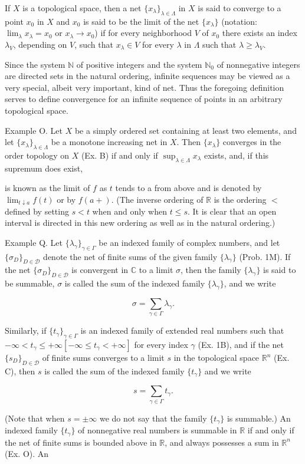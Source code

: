 If $X$ is a topological space, then a net $\{x_\lambda\}_{\lambda \in \Lambda}$ in $X$ is said to converge to a point $x_0$ in $X$ and $x_0$ is said to be the limit of the net $\{x_\lambda\}$ (notation: $\lim_\lambda x_\lambda = x_0$ or $x_\lambda \rightarrow x_0$) if for every neighborhood $V$ of $x_0$ there exists an index $\lambda_V$, depending on $V$, such that $x_\lambda \in V$ for every $\lambda$ in $\Lambda$ such that $\lambda \geq \lambda_V$.

Since the system $\mathbb{N}$ of positive integers and the system $\mathbb{N}_0$ of nonnegative integers are directed sets in the natural ordering, infinite sequences may be viewed as a very special, albeit very important, kind of net. Thus the foregoing definition serves to define convergence for an infinite sequence of points in an arbitrary topological space.

Example O. Let $X$ be a simply ordered set containing at least two elements, and let $\{x_\lambda\}_{\lambda \in \Lambda}$ be a monotone increasing net in $X$. Then $\{x_\lambda\}$ converges in the order topology on $X$ (Ex. B) if and only if $\sup_{\lambda \in \Lambda} x_\lambda$ exists, and, if this supremum does exist,

is known as the limit of $f$ as $t$ tends to a from above and is denoted by $\lim_{t \downarrow a} f(t)$ or by $f(a+)$. (The inverse ordering of $\mathbb{R}$ is the ordering $<$ defined by setting $s < t$ when and only when $t \leq s$. It is clear that an open interval is directed in this new ordering as well as in the natural ordering.)

Example Q. Let $\{\lambda_\gamma\}_{\gamma \in \Gamma}$ be an indexed family of complex numbers, and let $\{\sigma_D\}_{D \in \mathcal{D}}$ denote the net of finite sums of the given family $\{\lambda_\gamma\}$ (Prob. 1M). If the net $\{\sigma_D\}_{D \in \mathcal{D}}$ is convergent in $\mathbb{C}$ to a limit $\sigma$, then the family $\{\lambda_\gamma\}$ is said to be summable, $\sigma$ is called the sum of the indexed family $\{\lambda_\gamma\}$, and we write

$$\sigma = \sum_{\gamma \in \Gamma} \lambda_\gamma.$$

Similarly, if $\{t_\gamma\}_{\gamma \in \Gamma}$ is an indexed family of extended real numbers such that $-\infty < t_\gamma \leq +\infty [-\infty \leq t_\gamma < +\infty]$ for every index $\gamma$ (Ex. 1B), and if the net $\{s_D\}_{D \in \mathcal{D}}$ of finite sums converges to a limit $s$ in the topological space $\mathbb{R}^n$ (Ex. C), then $s$ is called the sum of the indexed family $\{t_\gamma\}$ and we write

$$s = \sum_{\gamma \in \Gamma} t_\gamma.$$

(Note that when $s = \pm\infty$ we do not say that the family $\{t_\gamma\}$ is summable.) An indexed family $\{t_\gamma\}$ of nonnegative real numbers is summable in $\mathbb{R}$ if and only if the net of finite sums is bounded above in $\mathbb{R}$, and always possesses a sum in $\mathbb{R}^n$ (Ex. O). An
